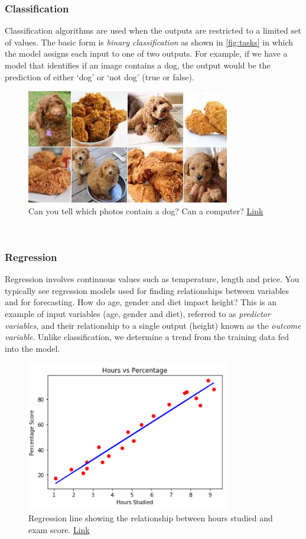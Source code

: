\documentclass{article}
\begin{document}
\subsubsection{Classification}
Classification algorithms are used when the outputs are restricted to a limited set of values. The basic form is \textit{binary classification} as shown in \ref{fig:tasks} in which the model assigns each input to one of two outputs. For example, if we have a model that identifies if an image contains a dog, the output would be the prediction of either `dog' or `not dog' (true or false).  

\begin{figure}[H]
    \centering
    \includegraphics[width=3.5in]{dogs.jpg}
    \caption{Can you tell which photos contain a dog? Can a computer? \href{https://www.npr.org/sections/thesalt/2016/03/11/470084215/canine-or-cuisine-this-photo-meme-is-fetching}{Link}}
\end{figure}

\newpage
\subsubsection{Regression}
Regression involves continuous values such as temperature, length and price. You typically see regression models used for finding relationships between variables and for forecasting. How do age, gender and diet impact height? This is an example of input variables (age, gender and diet), referred to as \textit{predictor variables}, and their relationship to a single output (height) known as the \textit{outcome variable}. Unlike classification, we determine a trend from the training data fed into the model.  

\begin{figure}[H]
    \centering
    \includegraphics[width=3.5in]{regression.png}
    \caption{Regression line showing the relationship between hours studied and exam score. \href{https://stackabuse.com/linear-regression-in-python-with-scikit-learn/}{Link}}
\end{figure}
\end{document}
